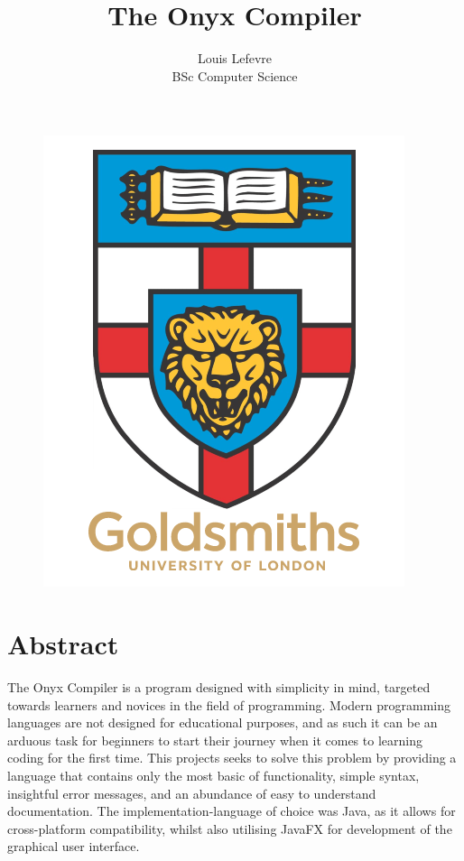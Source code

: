 \documentclass[
]{report}
\title{The Onyx Compiler}
\author{Louis Lefevre\\BSc Computer Science}
\date{}
\begin{document}
\begin{figure}
	\includegraphics[scale=0.6]{goldsmiths-logo}
	\centering
	\maketitle
\end{figure}
\thispagestyle{empty}

\chapter*{Abstract}
The Onyx Compiler is a program designed with simplicity in mind,
targeted towards learners and novices in the field of programming.
Modern programming languages are not designed for educational purposes,
and as such it can be an arduous task for beginners to start their
journey when it comes to learning coding for the first time. This
projects seeks to solve this problem by providing a language that
contains only the most basic of functionality, simple syntax, insightful
error messages, and an abundance of easy to understand documentation.
The \gls{implementation-language} of choice was Java, as it allows 
for cross-platform compatibility, whilst also utilising JavaFX for development of the
graphical user interface.
\end{document}
